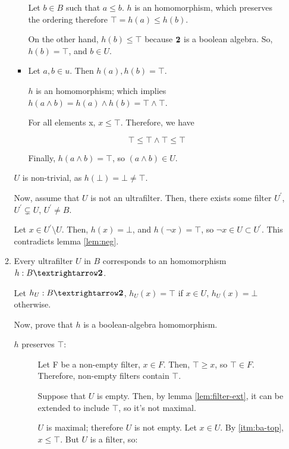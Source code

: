 \documentclass[notitlepage,a4paper]{article}
\begin{document}
\begin{enumerate}
\begin{enumerate}
\begin{itemize}
           Let $b ∈ B$ such that $a ≤ b$. $h$ is an homomorphism, which
           preserves the ordering therefore $⊤ = h(a) ≤ h(b)$.

           On the other hand, $h(b) ≤ ⊤$ because $\text{\bf 2}$ is a
           boolean algebra. So, $h(b) = ⊤$, and $b ∈ U$.

         \item

           Let $a, b ∈ u$. Then $h(a), h(b) = ⊤$.

           $h$ is an homomorphism; which implies $h(a ∧ b) = h(a) ∧ h(b) = ⊤ ∧ ⊤$.

           For all elements x, $x ≤ ⊤$. Therefore, we have

           $$⊤ ≤ ⊤ ∧ ⊤ ≤ ⊤$$

           Finally, $h(a ∧ b) = ⊤$, so $(a ∧ b) ∈ U$.

      \end{itemize}

      $U$ is non-trivial, as $h(⊥) = ⊥ ≠ ⊤$.

      Now, assume that $U$ is not an ultrafilter. Then, there exists
      some filter $U^\prime$, $U^\prime \subsetneq U$, $U^\prime ≠ B$.
           
      Let $x ∈ U^\prime \setminus U$. Then, $h(x) = ⊥$, and
      $h(¬x) = ⊤$, so $¬x ∈ U \subset U^\prime$. This contradicts
      lemma \ref{lem:neg}.

   \item Every ultrafilter $U$ in $B$ corresponds to an homomorphism $h : B → \text{\bf 2}$.

     
     
     Let $h_U : B → \text{\bf 2}$, $h_U(x) = ⊤$ if $x ∈ U$, $h_U(x) = ⊥$ otherwise.

     Now, prove that $h$ is a boolean-algebra homomorphism.

     \begin{description}
       \item[$h$ preserves $⊤$:]

         Let F be a non-empty filter, $x ∈ F$. Then, $⊤ ≥ x$, so
         $⊤ ∈ F$. Therefore, non-empty filters contain $⊤$.

         Suppose that $U$ is empty. Then, by lemma \ref{lem:filter-ext},
         it can be extended to include $⊤$, so it's not maximal.
         
         $U$ is maximal; therefore $U$ is not empty. Let $x ∈ U$.
         By \ref{itm:ba-top}, $x ≤ ⊤$. But $U$ is a filter, so:
         

\end{description}
\end{enumerate}
\end{enumerate}
\end{document}
